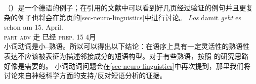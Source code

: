 \begin{exe}
\begin{xlist}[iv.]
\begin{exe}
\begin{xlist}[iv.]
（）是一个德语的例子；在引用的文献中可以看到好几页经过验证的例句并且更复杂的例子也将会在第\pageref{ex-complex-vf}页的\ref{sec-neuro-linguistics}中进行讨论。
\ea\label{bsp-los-damit-zwei}
\gll \emph{Los} damit \emph{geht} es schon am 15. April.\footnotemark\\
      \textsc{part} \textsc{adv} 走 \expl{} 已经 \textsc{prep}. 15 4月\\%
%
\z
小词动词是小--熟语。所以可以得出以下结论：在语序上具有一定灵活性的熟语性表达不应该被表征为描述邻接成分的短语构型。对于有些熟语，按照 的研究思路好像是需要的。
小词动词问题会在\ref{sec-neuro-linguistics}中再次提到，那里我们将讨论来自神经科学方面的支持/反对短语分析的证据。


\end{xlist}
\end{exe}
\end{xlist}
\end{exe}
